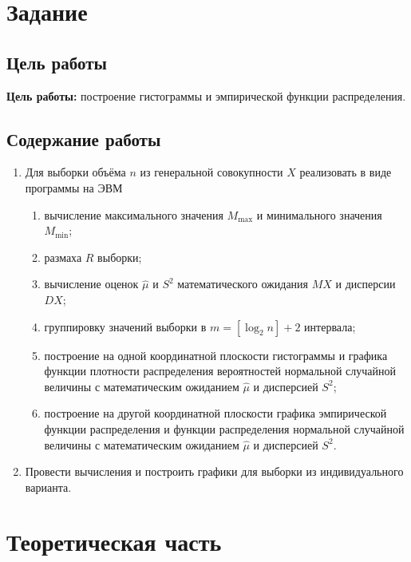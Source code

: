 \chapter{Задание}
\section{Цель работы}
\textbf{Цель работы:} построение гистограммы и эмпирической функции распределения.
\section{Содержание работы}
\begin{enumerate}
	\item Для выборки объёма $n$ из генеральной совокупности $X$ реализовать в виде программы на ЭВМ
	\begin{enumerate}
		\item вычисление максимального значения $M_{\max}$ и минимального значения $M_{\min}$;
		\item размаха $R$ выборки;
		\item вычисление оценок $\hat\mu$ и $S^2$ математического ожидания $MX$ и дисперсии $DX$;
		\item группировку значений выборки в $m = [\log_2 n] + 2$ интервала;
		\item построение на одной координатной плоскости гистограммы и графика функции плотности распределения вероятностей нормальной случайной величины с математическим ожиданием $\hat{\mu}$ и дисперсией $S^2$;
		\item построение на другой координатной плоскости графика эмпирической функции распределения и функции распределения нормальной случайной величины с математическим ожиданием $\hat{\mu}$ и дисперсией $S^2$.
	\end{enumerate}
	\item Провести вычисления и построить графики для выборки из индивидуального варианта.
\end{enumerate}


\chapter{Теоретическая часть}
